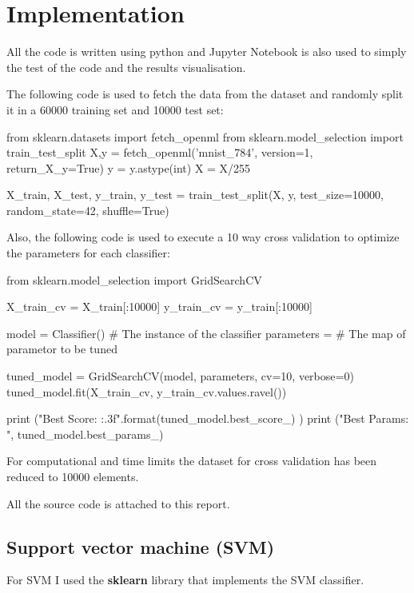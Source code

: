 \documentclass[12pt]{article}
\begin{document}
\section{Implementation}
All the code is written using python and Jupyter Notebook is also used to simply the 
test of the code and the results visualisation.

The following code is used to fetch the data from the dataset and randomly split it 
in a 60000 training set and 10000 test set:

\pagebreak
\begin{python}[caption={Dataset fetch},label={lst:dataset-fetch}]
from sklearn.datasets import fetch_openml
from sklearn.model_selection import train_test_split
X,y = fetch_openml('mnist_784', version=1, return_X_y=True)
y = y.astype(int)
X = X/255

X_train, X_test, y_train, y_test = train_test_split(X, y, 
            test_size=10000, random_state=42, shuffle=True)
\end{python}

Also, the following code is used to execute a 10 way cross validation to 
optimize the parameters for each classifier:
\begin{python}[caption={Cross Validation},label={lst:cross-validation}]
from sklearn.model_selection import GridSearchCV

X_train_cv = X_train[:10000]
y_train_cv = y_train[:10000]


model = Classifier()  # The instance of the classifier
parameters = {}       # The map of parametor to be tuned

        
tuned_model = GridSearchCV(model, parameters, cv=10, verbose=0)
tuned_model.fit(X_train_cv, y_train_cv.values.ravel())

print ("Best Score: {:.3f}".format(tuned_model.best_score_) )
print ("Best Params: ", tuned_model.best_params_)
\end{python}

For computational and time limits the dataset for cross validation has been reduced
to 10000 elements.


All the source code is attached to this report.

\subsection{Support vector machine (SVM)}

For SVM I used the \textbf{sklearn} library that implements the SVM classifier.
\end{document}
